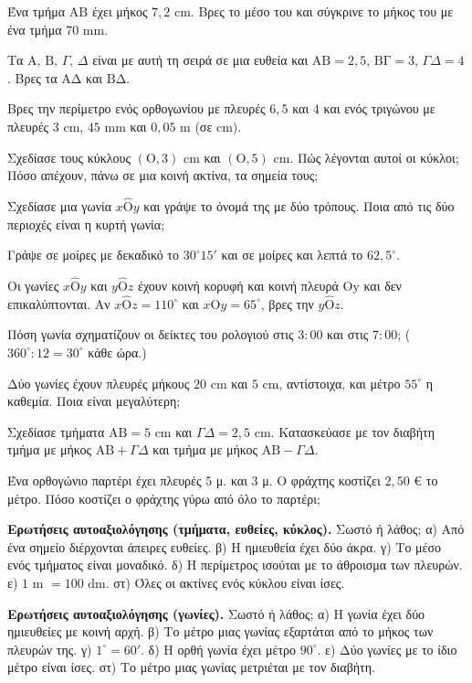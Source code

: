 \ex Ένα τμήμα $\mathrm{ΑΒ}$ έχει μήκος $7{,}2$ cm. Βρες το μέσο του και σύγκρινε το μήκος του με ένα τμήμα $70$ mm.

\ex Τα $\mathrm{Α},\,\mathrm{Β},\,\Gamma,\,\Delta$ είναι με αυτή τη σειρά σε μια ευθεία και $\mathrm{ΑΒ}=2{,}5$, $\mathrm{ΒΓ}=3$, $\Gamma\Delta=4$. Βρες τα $\mathrm{ΑΔ}$ και $\mathrm{ΒΔ}$.

\ex Βρες την περίμετρο ενός ορθογωνίου με πλευρές $6{,}5$ και $4$ και ενός τριγώνου με πλευρές $3$ cm, $45$ mm και $0{,}05$ m (σε cm).

\ex Σχεδίασε τους κύκλους $(\mathrm{Ο},3)$ cm και $(\mathrm{Ο},5)$ cm. Πώς λέγονται αυτοί οι κύκλοι; Πόσο απέχουν, πάνω σε μια κοινή ακτίνα, τα σημεία τους;

\ex Σχεδίασε μια γωνία $x\hat{\mathrm{Ο}}y$ και γράψε το όνομά της με δύο τρόπους. Ποια από τις δύο περιοχές είναι η κυρτή γωνία;

\ex Γράψε σε μοίρες με δεκαδικό το $30^\circ15'$ και σε μοίρες και λεπτά το $62{,}5^\circ$.

\ex Οι γωνίες $x\hat{\mathrm{Ο}}y$ και $y\hat{\mathrm{Ο}}z$ έχουν κοινή κορυφή και κοινή πλευρά $\mathrm{Οy}$ και δεν επικαλύπτονται. Αν $x\hat{\mathrm{Ο}}z=110^\circ$ και $x\hat{\mathrm{Ο}}y=65^\circ$, βρες την $y\hat{\mathrm{Ο}}z$.

\ex Πόση γωνία σχηματίζουν οι δείκτες του ρολογιού στις $3{:}00$ και στις $7{:}00$; ($360^\circ:12=30^\circ$ κάθε ώρα.)

\ex Δύο γωνίες έχουν πλευρές μήκους $20$ cm και $5$ cm, αντίστοιχα, και μέτρο $55^\circ$ η καθεμία. Ποια είναι μεγαλύτερη;

\ex Σχεδίασε τμήματα $\mathrm{ΑΒ}=5$ cm και $\Gamma\Delta=2{,}5$ cm. Κατασκεύασε με τον διαβήτη τμήμα με μήκος $\mathrm{ΑΒ}+\Gamma\Delta$ και τμήμα με μήκος $\mathrm{ΑΒ}-\Gamma\Delta$.

\ex Ένα ορθογώνιο παρτέρι έχει πλευρές $5$ μ. και $3$ μ. Ο φράχτης κοστίζει $2{,}50$ € το μέτρο. Πόσο κοστίζει ο φράχτης γύρω από όλο το παρτέρι;

\ex \textbf{Ερωτήσεις αυτοαξιολόγησης (τμήματα, ευθείες, κύκλος).} Σωστό ή λάθος; α) Από ένα σημείο διέρχονται άπειρες ευθείες. \quad β) Η ημιευθεία έχει δύο άκρα. \quad γ) Το μέσο ενός τμήματος είναι μοναδικό. \quad δ) Η περίμετρος ισούται με το άθροισμα των πλευρών. \quad ε) $1$ m $=100$ dm. \quad στ) Όλες οι ακτίνες ενός κύκλου είναι ίσες.

\ex \textbf{Ερωτήσεις αυτοαξιολόγησης (γωνίες).} Σωστό ή λάθος; α) Η γωνία έχει δύο ημιευθείες με κοινή αρχή. \quad β) Το μέτρο μιας γωνίας εξαρτάται από το μήκος των πλευρών της. \quad γ) $1^\circ=60'$. \quad δ) Η ορθή γωνία έχει μέτρο $90^\circ$. \quad ε) Δύο γωνίες με το ίδιο μέτρο είναι ίσες. \quad στ) Το μέτρο μιας γωνίας μετριέται με τον διαβήτη.

